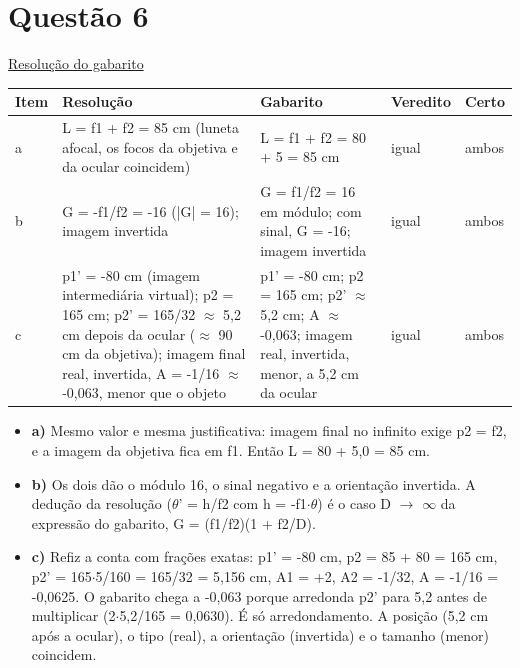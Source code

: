\documentclass{article}%
\begin{document}
\section*{Questão 6}%
\href{https://poliedroresolve.sistemapoliedro.com.br/vestibulares/ita/2026/ita-2-fase-dia-3-30-10-2025-2-fase-dia-3/dissertativa-6-fisica-2-fase-dia-3-ita-2026}{Resolução do gabarito}\par\smallskip%
\begin{longtable}{@{}p{} p{} p{} p{} p{}@{}}\toprule Item & Resolução & Gabarito & Veredito & Certo \\ \midrule
a & L = f1 + f2 = 85 cm (luneta afocal, os focos da objetiva e da ocular coincidem) & L = f1 + f2 = 80 + 5 = 85 cm & igual & ambos \\
b & G = -f1/f2 = -16 (|G| = 16); imagem invertida & G = f1/f2 = 16 em módulo; com sinal, G = -16; imagem invertida & igual & ambos \\
c & p1' = -80 cm (imagem intermediária virtual); p2 = 165 cm; p2' = 165/32 $\approx$ 5,2 cm depois da ocular ($\approx$ 90 cm da objetiva); imagem final real, invertida, A = -1/16 $\approx$ -0,063, menor que o objeto & p1' = -80 cm; p2 = 165 cm; p2' $\approx$ 5,2 cm; A $\approx$ -0,063; imagem real, invertida, menor, a 5,2 cm da ocular & igual & ambos \\
\bottomrule\end{longtable}%
\begin{itemize}%
\item%
\textbf{a)} Mesmo valor e mesma justificativa: imagem final no infinito exige p2 = f2, e a imagem da objetiva fica em f1. Então L = 80 + 5,0 = 85 cm.%
\item%
\textbf{b)} Os dois dão o módulo 16, o sinal negativo e a orientação invertida. A dedução da resolução ($\theta$' = h/f2 com h = -f1$\cdot$$\theta$) é o caso D $\to$ $\infty$ da expressão do gabarito, G = (f1/f2)(1 + f2/D).%
\item%
\textbf{c)} Refiz a conta com frações exatas: p1' = -80 cm, p2 = 85 + 80 = 165 cm, p2' = 165$\cdot$5/160 = 165/32 = 5,156 cm, A1 = +2, A2 = -1/32, A = -1/16 = -0,0625. O gabarito chega a -0,063 porque arredonda p2' para 5,2 antes de multiplicar (2$\cdot$5,2/165 = 0,0630). É só arredondamento. A posição (5,2 cm após a ocular), o tipo (real), a orientação (invertida) e o tamanho (menor) coincidem.%
\end{itemize}%
\end{document}
